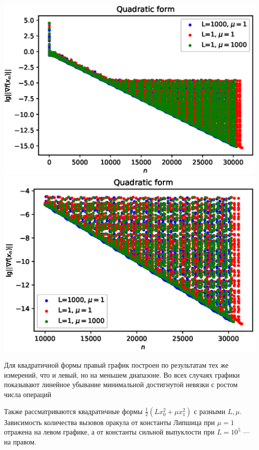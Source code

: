 \documentclass{crm-article}
\begin{document}
\noindent
\includegraphics[scale=0.5]{plots/algm3.eps}
\includegraphics[scale=0.5]{plots/algm4.eps}

Для квадратичной формы правый график построен по результатам тех же измерений, что и левый, но на меньшем диапазоне. Во всех случаях графики показывают линейное убывание минимальной достигнутой невязки с ростом числа операций

Также рассматриваются квадратичные формы $\frac{1}{2}(Lx_0^2+\mu x_1^2)$ с разными $L,\mu$. Зависимость количества вызовов оракула от константы Липшица при $\mu=1$ отражена на левом графике, а от константы сильной выпуклости при $L=10^5$ --- на правом.
\end{document}

